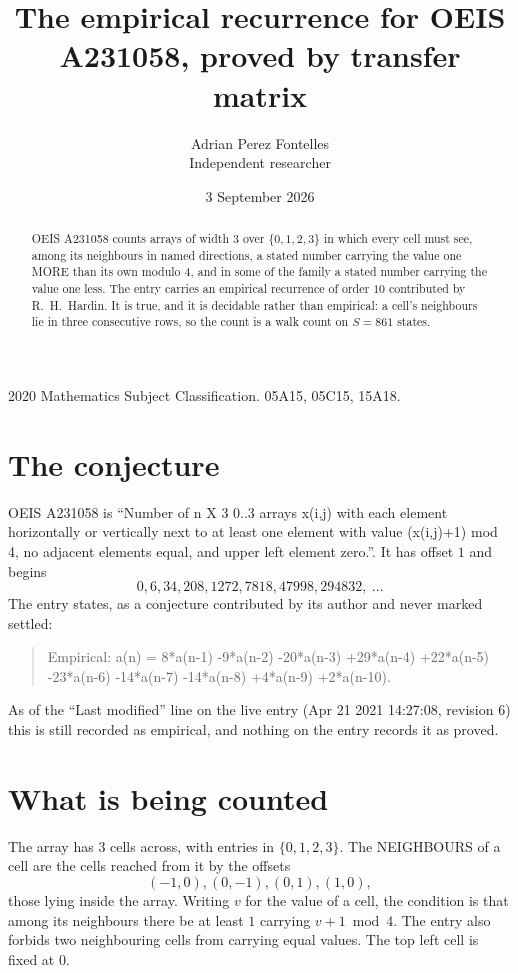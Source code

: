 \documentclass[11pt,a4paper]{article}
\title{The empirical recurrence for OEIS A231058, proved by transfer matrix}
\author{Adrian Perez Fontelles\\ \small Independent researcher}
\date{3 September 2026}
\theoremstyle{plain}
\theoremstyle{definition}
\begin{document}
\maketitle

\begin{abstract}
OEIS A231058 counts arrays of width $3$ over $\{0,1,2,3\}$ in which every cell must see, among its
neighbours in named directions, a stated number carrying the value one MORE than its own
modulo $4$, and in some of the family a stated number carrying the value one less. The entry
carries an empirical recurrence of order $10$ contributed by R.~H.~Hardin. It is true, and
it is decidable rather than empirical: a cell's neighbours lie in three consecutive rows, so
the count is a walk count on $S=861$ states.
\end{abstract}

\noindent\small 2020 Mathematics Subject Classification. 05A15, 05C15, 15A18.\normalsize

\section{The conjecture}

OEIS A231058 is ``Number of n X 3 0..3 arrays x(i,j) with each element horizontally or vertically next to at least one element with value (x(i,j)+1) mod 4, no adjacent elements equal, and upper left element zero.''. It has offset $1$ and begins
\[
0, 6, 34, 208, 1272, 7818, 47998, 294832,\ \dots
\]
The entry states, as a conjecture contributed by its author and never marked settled:
\begin{quote}
Empirical: a(n) = 8*a(n-1) -9*a(n-2) -20*a(n-3) +29*a(n-4) +22*a(n-5) -23*a(n-6) -14*a(n-7) -14*a(n-8) +4*a(n-9) +2*a(n-10).
\end{quote}
As of the ``Last modified'' line on the live entry (Apr 21 2021 14:27:08, revision 6) this is still
recorded as empirical, and nothing on the entry records it as proved.

\section{What is being counted}

The array has $3$ cells across, with entries in $\{0,1,2,3\}$. The NEIGHBOURS of a cell are the
cells reached from it by the offsets
\[
(-1,0), (0,-1), (0,1), (1,0),
\]
those lying inside the array. Writing $v$ for the value of a cell, the condition is that among
its neighbours there be at least $1$ carrying $v+1 \bmod 4$. The entry also forbids two neighbouring cells from carrying equal values. The top left
cell is fixed at $0$.
\end{document}
